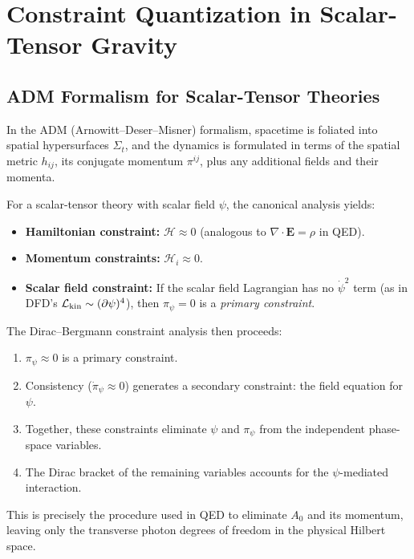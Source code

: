 \documentclass[12pt,a4paper]{article}
\begin{document}
\section{Constraint Quantization in Scalar-Tensor Gravity}
\label{sec:constraint-quantization}

\subsection{ADM Formalism for Scalar-Tensor Theories}

In the ADM (Arnowitt--Deser--Misner) formalism, spacetime is foliated into spatial hypersurfaces $\Sigma_t$, and the dynamics is formulated in terms of the spatial metric $h_{ij}$, its conjugate momentum $\pi^{ij}$, plus any additional fields and their momenta.

For a scalar-tensor theory with scalar field $\psi$, the canonical analysis yields:
\begin{itemize}
\item \textbf{Hamiltonian constraint:} $\mathcal{H} \approx 0$ (analogous to $\nabla\cdot\mathbf{E} = \rho$ in QED).
\item \textbf{Momentum constraints:} $\mathcal{H}_i \approx 0$.
\item \textbf{Scalar field constraint:} If the scalar field Lagrangian has no $\dot{\psi}^2$ term (as in DFD's $\mathcal{L}_{\rm kin} \sim (\partial\psi)^4$), then $\pi_\psi = 0$ is a \emph{primary constraint}.
\end{itemize}

The Dirac--Bergmann constraint analysis then proceeds:
\begin{enumerate}
\item $\pi_\psi \approx 0$ is a primary constraint.
\item Consistency ($\dot{\pi}_\psi \approx 0$) generates a secondary constraint: the field equation for $\psi$.
\item Together, these constraints eliminate $\psi$ and $\pi_\psi$ from the independent phase-space variables.
\item The Dirac bracket of the remaining variables accounts for the $\psi$-mediated interaction.
\end{enumerate}

This is precisely the procedure used in QED to eliminate $A_0$ and its momentum, leaving only the transverse photon degrees of freedom in the physical Hilbert space.
\end{document}
